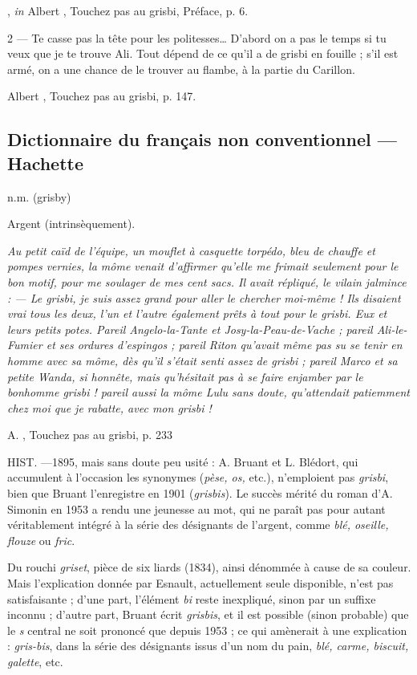 			, \emph{in} Albert , Touchez pas au grisbi, Préface, p. 6.

2 --- \og Te casse pas la tête pour les politesses\ldots{ } D'abord on a pas le temps si tu veux que je te trouve Ali. Tout dépend de ce qu'il a de grisbi en fouille ; s'il est armé, on a une chance de le trouver au flambe, à la partie du Carillon.\fg{}

			Albert , Touchez pas au grisbi, p. 147.


\subsection*{Dictionnaire du français non conventionnel --- Hachette}

n.m. (grisby)

Argent (intrinsèquement).

\emph{Au petit caïd de l'équipe, un mouflet à casquette torpédo, bleu de
chauffe et pompes vernies, la môme venait d'affirmer qu'elle me frimait
seulement pour le bon motif, pour me soulager de mes cent sacs. Il avait
répliqué, le vilain jalmince :
--- Le \emph{grisbi}, je suis assez grand pour aller le chercher moi-même !
Ils disaient vrai tous les deux, l'un et l'autre également prêts à tout pour le
\emph{grisbi}. Eux et leurs petits potes. Pareil Angelo-la-Tante et
Josy-la-Peau-de-Vache ; pareil Ali-le-Fumier et ses ordures d'espingos ;
pareil Riton qu'avait même pas su se tenir en homme avec sa môme, dès qu'il
s'était senti assez de \emph{grisbi} ; pareil Marco et sa petite Wanda, si
honnête, mais qu'hésitait pas à se faire enjamber par le bonhomme \emph{grisbi} ! pareil aussi la môme Lulu sans doute, qu'attendait patiemment chez moi que je rabatte, avec mon \emph{grisbi} !}

			A. , Touchez pas au grisbi, p. 233

HIST. ---1895, mais sans doute peu usité : A. Bruant et L. Blédort, qui
accumulent à l'occasion les synonymes (\emph{pèse, os,} etc.), n'emploient pas \emph{grisbi}, bien que Bruant l'enregistre en 1901 (\emph{grisbis}). Le succès mérité du roman d'A. Simonin en 1953 a rendu une jeunesse au mot, qui ne paraît pas pour autant véritablement intégré à la série des désignants de l'argent, comme \emph{blé, oseille, flouze} ou \emph{fric}.

Du rouchi \emph{griset}, \og pièce de six liards \fg{} (1834), ainsi dénommée à cause de sa couleur. Mais l'explication donnée par Esnault, actuellement seule 
disponible, n'est pas satisfaisante ; d'une part, l'élément \emph{bi} reste
inexpliqué, sinon par un \og suffixe \fg{} inconnu ; d'autre part, Bruant écrit
\emph{grisbis}, et il est possible (sinon probable) que le \emph{s} central ne
soit prononcé que depuis 1953 ; ce qui amènerait à une explication :
\emph{gris-bis}, dans la série des désignants issus d'un nom du pain,
\emph{blé, carme, biscuit, galette}, etc.

